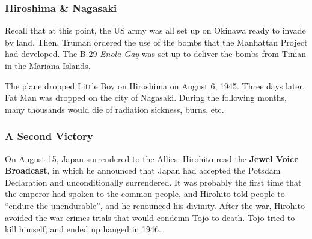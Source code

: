 \subsubsection*{Hiroshima \& Nagasaki}

Recall that at this point, the US army was all set up on Okinawa ready to invade by land.
Then, Truman ordered the use of the bombs that the Manhattan Project had developed.
The B-29 \textit{Enola Gay} was set up to deliver the bombs from Tinian in the Mariana Islands.

The plane dropped Little Boy on Hiroshima on August 6, 1945.
Three days later, Fat Man was dropped on the city of Nagasaki.
During the following months, many thousands would die of radiation sickness, burns, etc.

\subsubsection*{A Second Victory}

On August 15, Japan surrendered to the Allies.
Hirohito read the \textbf{Jewel Voice Broadcast},
in which he announced
that Japan had accepted the Potsdam Declaration and unconditionally surrendered.
It was probably the first time that the emperor had spoken to the common people,
and Hirohito told people to ``endure the unendurable'', and he renounced his divinity.
After the war, Hirohito avoided the war crimes trials that would condemn Tojo to death.
Tojo tried to kill himself, and ended up hanged in 1946.
